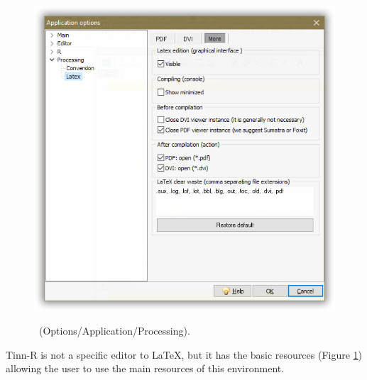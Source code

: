 \begin{figure}[h!]
  \includegraphics[scale=0.33]{./res/app_processing_latex_more.png}\\
  \caption{\Latex ~(Options/Application/Processing).}
  \label{fig:app_processing_latex_options}
\end{figure}

Tinn-R is not a specific editor to \LaTeX, but it has the basic resources (Figure \ref{fig:app_processing_latex_options}) allowing the user to use the main resources of this environment.
